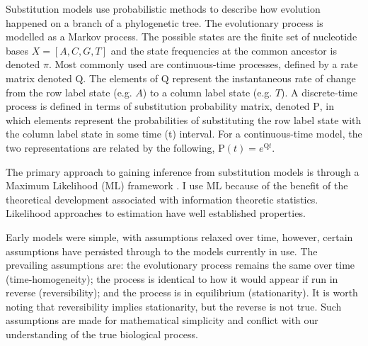 Substitution models use probabilistic methods to describe how evolution happened on a branch of a phylogenetic tree. The evolutionary process is modelled as a Markov process. The possible states are the finite set of nucleotide bases $X = [A, C, G, T]$ and the state frequencies at the common ancestor is denoted $\pi$. Most commonly used are continuous-time processes, defined by a rate matrix denoted $\mathrm{Q}$. The elements of $\mathrm{Q}$ represent the instantaneous rate of change from the row label state (e.g. $A$) to a column label state (e.g. $T$). A discrete-time process is defined in terms of substitution probability matrix, denoted $\mathrm{P}$, in which elements represent the probabilities of substituting the row label state with the column label state in some time (t) interval. For a continuous-time model, the two representations are related by the following, $\mathrm{P}(t) = e^{\mathrm{Q}t}$. 

The primary approach to gaining inference from substitution models is through a Maximum Likelihood (ML) framework \citep{Whelan2001MolecularPast}. I use ML because of the benefit of the theoretical development associated with information theoretic statistics. Likelihood approaches to estimation have well established properties. 

Early models were simple, with assumptions relaxed over time, however, certain assumptions have persisted through to the models currently in use. The prevailing assumptions are: the evolutionary process remains the same over time (time-homogeneity); the process is identical to how it would appear if run in reverse (reversibility); and the process is in equilibrium (stationarity). It is worth noting that reversibility implies stationarity, but the reverse is not true. Such assumptions are made for mathematical simplicity and conflict with our understanding of the true biological process. 

